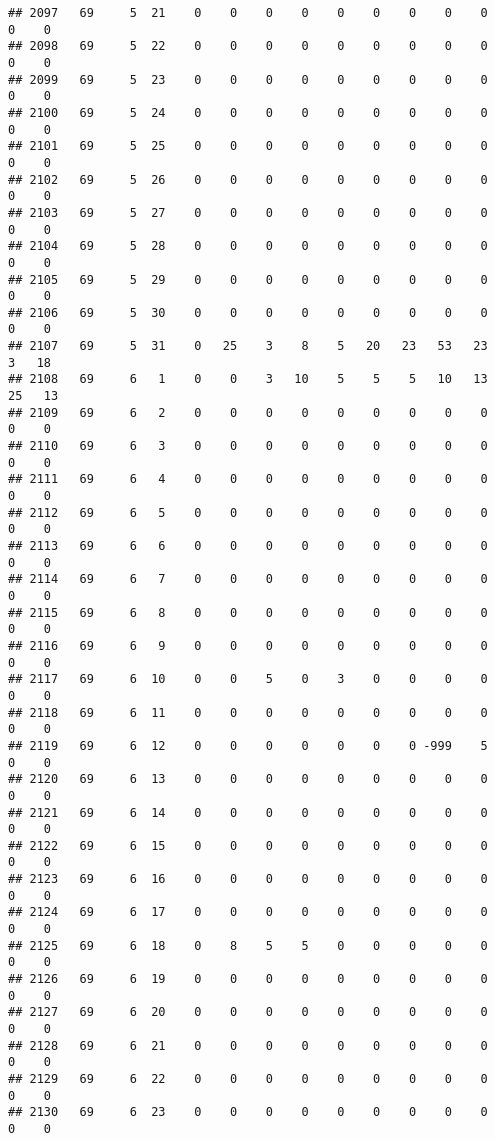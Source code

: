 \documentclass[]{article}
\begin{document}
\begin{verbatim}
## 2097   69     5  21    0    0    0    0    0    0    0    0    0    0    0
## 2098   69     5  22    0    0    0    0    0    0    0    0    0    0    0
## 2099   69     5  23    0    0    0    0    0    0    0    0    0    0    0
## 2100   69     5  24    0    0    0    0    0    0    0    0    0    0    0
## 2101   69     5  25    0    0    0    0    0    0    0    0    0    0    0
## 2102   69     5  26    0    0    0    0    0    0    0    0    0    0    0
## 2103   69     5  27    0    0    0    0    0    0    0    0    0    0    0
## 2104   69     5  28    0    0    0    0    0    0    0    0    0    0    0
## 2105   69     5  29    0    0    0    0    0    0    0    0    0    0    0
## 2106   69     5  30    0    0    0    0    0    0    0    0    0    0    0
## 2107   69     5  31    0   25    3    8    5   20   23   53   23    3   18
## 2108   69     6   1    0    0    3   10    5    5    5   10   13   25   13
## 2109   69     6   2    0    0    0    0    0    0    0    0    0    0    0
## 2110   69     6   3    0    0    0    0    0    0    0    0    0    0    0
## 2111   69     6   4    0    0    0    0    0    0    0    0    0    0    0
## 2112   69     6   5    0    0    0    0    0    0    0    0    0    0    0
## 2113   69     6   6    0    0    0    0    0    0    0    0    0    0    0
## 2114   69     6   7    0    0    0    0    0    0    0    0    0    0    0
## 2115   69     6   8    0    0    0    0    0    0    0    0    0    0    0
## 2116   69     6   9    0    0    0    0    0    0    0    0    0    0    0
## 2117   69     6  10    0    0    5    0    3    0    0    0    0    0    0
## 2118   69     6  11    0    0    0    0    0    0    0    0    0    0    0
## 2119   69     6  12    0    0    0    0    0    0    0 -999    5    0    0
## 2120   69     6  13    0    0    0    0    0    0    0    0    0    0    0
## 2121   69     6  14    0    0    0    0    0    0    0    0    0    0    0
## 2122   69     6  15    0    0    0    0    0    0    0    0    0    0    0
## 2123   69     6  16    0    0    0    0    0    0    0    0    0    0    0
## 2124   69     6  17    0    0    0    0    0    0    0    0    0    0    0
## 2125   69     6  18    0    8    5    5    0    0    0    0    0    0    0
## 2126   69     6  19    0    0    0    0    0    0    0    0    0    0    0
## 2127   69     6  20    0    0    0    0    0    0    0    0    0    0    0
## 2128   69     6  21    0    0    0    0    0    0    0    0    0    0    0
## 2129   69     6  22    0    0    0    0    0    0    0    0    0    0    0
## 2130   69     6  23    0    0    0    0    0    0    0    0    0    0    0

\end{verbatim}
\end{document}
